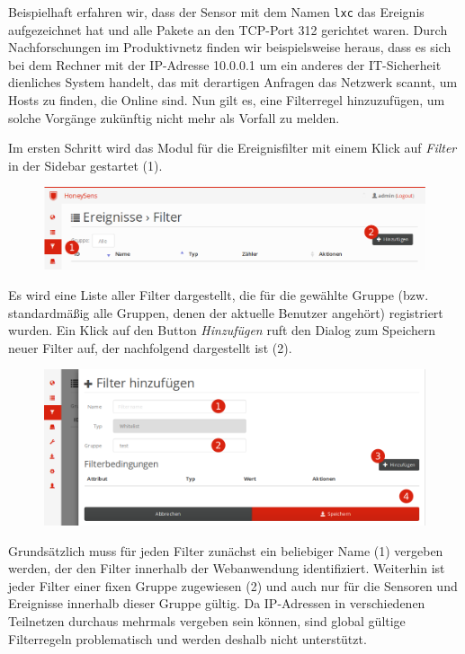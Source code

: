 \documentclass[12pt]{article}
\begin{document}
Beispielhaft erfahren wir, dass der Sensor mit dem Namen \verb|lxc| das Ereignis aufgezeichnet hat und alle Pakete an den TCP-Port 312 gerichtet waren. Durch Nachforschungen im Produktivnetz finden wir beispielsweise heraus, dass es sich bei dem Rechner mit der IP-Adresse 10.0.0.1 um ein anderes der IT-Sicherheit dienliches System handelt, das mit derartigen Anfragen das Netzwerk scannt, um Hosts zu finden, die Online sind. Nun gilt es, eine Filterregel hinzuzufügen, um solche Vorgänge zukünftig nicht mehr als Vorfall zu melden.

Im ersten Schritt wird das Modul für die Ereignisfilter mit einem Klick auf \textit{Filter} in der Sidebar gestartet (1).
\begin{figure}[h]
				\centering
				\includegraphics[width=\textwidth]{./graphics/howto-event-filter-3.png}
				\label{fig:howto-event-filter-3}
\end{figure}
Es wird eine Liste aller Filter dargestellt, die für die gewählte Gruppe (bzw. standardmäßig alle Gruppen, denen der aktuelle Benutzer angehört) registriert wurden. Ein Klick auf den Button \textit{Hinzufügen} ruft den Dialog zum Speichern neuer Filter auf, der nachfolgend dargestellt ist (2).

\newpage
\begin{figure}[h]
				\centering
				\includegraphics[width=\textwidth]{./graphics/howto-event-filter-4.png}
				\label{fig:howto-event-filter-4}
\end{figure}

Grundsätzlich muss für jeden Filter zunächst ein beliebiger Name (1) vergeben werden, der den Filter innerhalb der Webanwendung identifiziert. Weiterhin ist jeder Filter einer fixen Gruppe zugewiesen (2) und auch nur für die Sensoren und Ereignisse innerhalb dieser Gruppe gültig. Da IP-Adressen in verschiedenen Teilnetzen durchaus mehrmals vergeben sein können, sind global gültige Filterregeln problematisch und werden deshalb nicht unterstützt.
\end{document}
